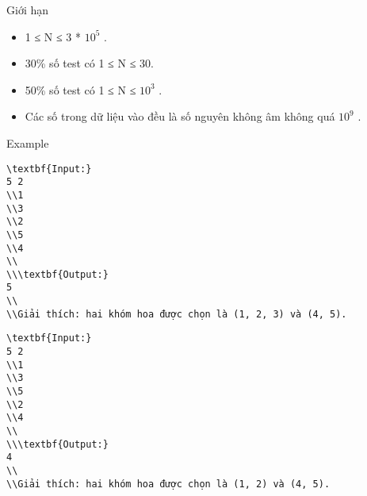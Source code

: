 Giới hạn
\begin{itemize}
	\item     1 ≤ N ≤ 3 * $10^{5}$    .   
	\item     30\% số test có 1 ≤ N ≤ 30.   
	\item     50\% số test có 1 ≤ N ≤ $10^{3}$    .   
	\item     Các số trong dữ liệu vào đều là số nguyên không âm không quá $10^{9}$    .   
\end{itemize}
Example
\begin{verbatim}
\textbf{Input:}
5 2
\\1 
\\3 
\\2 
\\5 
\\4
\\
\\\textbf{Output:}
5
\\
\\Giải thích: hai khóm hoa được chọn là (1, 2, 3) và (4, 5).\end{verbatim}
\begin{verbatim}
\textbf{Input:}
5 2
\\1 
\\3 
\\5 
\\2 
\\4
\\
\\\textbf{Output:}
4
\\
\\Giải thích: hai khóm hoa được chọn là (1, 2) và (4, 5).\end{verbatim}